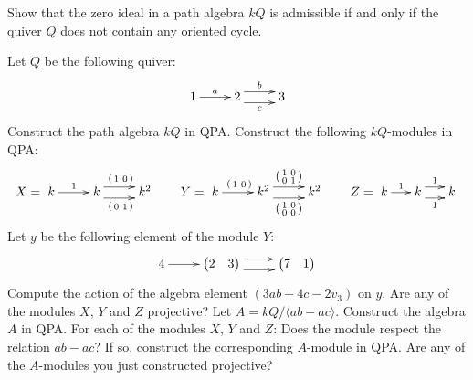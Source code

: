 \documentclass[a4paper]{amsart}
\newcommand{\VV}[2]{\begin{pmatrix} #1 & #2 \end{pmatrix}}
\newcommand{\vv}[2]{\left( \begin{smallmatrix} #1 & #2 \end{smallmatrix} \right)}
\begin{document}
\begin{Exercise}
Show that the zero ideal in a path algebra $kQ$ is admissible if and
only if the quiver $Q$ does not contain any oriented cycle.
\end{Exercise}

\begin{Exercise}
Let $Q$ be the following quiver:
\[
\xymatrix{
1 \ar[r]^a &
2 \ar@<1ex>[r]^b \ar@<-1ex>[r]_c &
3
}
\]
\Question Construct the path algebra $kQ$ in QPA.
\Question Construct the following $kQ$-modules in QPA:
\[
X =
\xymatrix{
k \ar[r]^1 &
k \ar@<1ex>[r]^{\vv{1}{0}}
  \ar@<-1ex>[r]_{\vv{0}{1}} &
k^2
}
\qquad
Y =
\xymatrix{
k \ar[r]^{\vv{1}{0}} &
k^2 \ar@<1ex>[r]^{\left(\begin{smallmatrix} 1&0 \\ 0&1 \end{smallmatrix}\right)}
    \ar@<-1ex>[r]_{\left(\begin{smallmatrix} 1&0 \\ 0&0 \end{smallmatrix}\right)} &
k^2
}
\qquad
Z =
\xymatrix@C=1.5em{
k \ar[r]^1 &
k \ar@<1ex>[r]^{1}
  \ar@<-1ex>[r]_{1} &
k
}
\]
\Question Let $y$ be the following element of the module $Y$:
\[
\xymatrix{
4 \ar[r] &
{\VV{2}{3}} \ar@<1ex>[r] \ar@<-1ex>[r] &
{\VV{7}{1}}
}
\]
Compute the action of the algebra element $(3ab + 4c - 2v_3)$ on $y$.
\Question Are any of the modules $X$, $Y$ and $Z$ projective?
\Question Let $A = kQ/\langle ab - ac \rangle$.  Construct the algebra
$A$ in QPA.
\Question For each of the modules $X$, $Y$ and $Z$: Does the module
respect the relation $ab - ac$?  If so, construct the corresponding
$A$-module in QPA.
\Question Are any of the $A$-modules you just constructed projective?
\end{Exercise}







\end{document}
